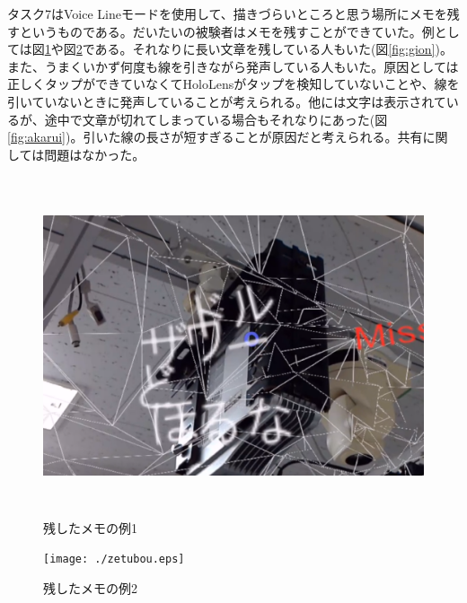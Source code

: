 \documentclass[11pt,a4j, titlepage]{jarticle} %
\begin{document}
タスク7はVoice Lineモードを使用して、描きづらいところと思う場所にメモを残すというものである。だいたいの被験者はメモを残すことができていた。例としては図\ref{fig:theworld}や図\ref{fig:zetubou}である。それなりに長い文章を残している人もいた(図\ref{fig:gion})。また、うまくいかず何度も線を引きながら発声している人もいた。原因としては正しくタップができていなくてHoloLensがタップを検知していないことや、線を引いていないときに発声していることが考えられる。他には文字は表示されているが、途中で文章が切れてしまっている場合もそれなりにあった(図\ref{fig:akarui})。引いた線の長さが短すぎることが原因だと考えられる。共有に関しては問題はなかった。

\begin{figure}[H]
  \begin{center}
    \includegraphics[clip,height=10.0cm,width=12.0cm]{./theworld.eps}
    \caption{残したメモの例1}
    \label{fig:theworld}
  \end{center}
\end{figure}

\begin{figure}[H]
  \begin{center}
    \texttt{[image: ./zetubou.eps]}
    \caption{残したメモの例2}
    \label{fig:zetubou}
  \end{center}
\end{figure}
\end{document}
